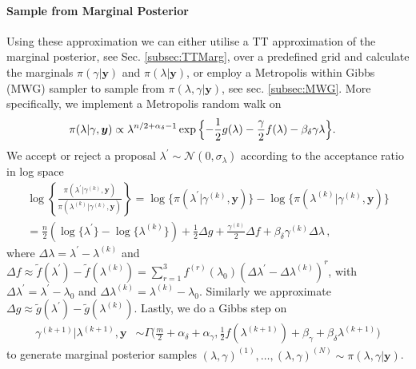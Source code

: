 \paragraph{Sample from Marginal Posterior}
Using these approximation we can either utilise a TT approximation of the marginal posterior, see Sec. \ref{subsec:TTMarg}, over a predefined grid and calculate the marginals $\pi(\gamma|\bm{y})$ and $\pi(\lambda|\bm{y})$, or employ a Metropolis within Gibbs (MWG) sampler to sample from $\pi(\lambda,\gamma|\bm{y})$, see sec. \ref{subsec:MWG}.
More specifically, we implement a Metropolis random walk on
\begin{align}
	\label{eq:margApplCondGam}
	\pi(\lambda | \gamma, \bm{y}) &\propto \lambda^{n/2 +\alpha_{\delta}-1} \exp{\Bigl\{ - \frac{1}{2} g ( \lambda) - \frac{\gamma}{2} f ( \lambda) - \beta_\delta \gamma \lambda \Bigr\}}.
\end{align} 
We accept or reject a proposal $\lambda^{\prime} \sim \mathcal{N}(0, \sigma_{\lambda})$ according to the acceptance ratio in log space
\begin{align} 
	\log \left\{ \frac{\pi(\lambda^{\prime} | \gamma^{(k)}, \bm{y})  }{\pi(\lambda^{(k)}| \gamma^{(k)}, \bm{y})}  \right\} 
	= \log  \{\pi(\lambda^{\prime} | \gamma^{(k)}, \bm{y} ) \}  -\log  \{ \pi(\lambda^{(k)}| \gamma^{(k)}, \bm{y}) \} \\
	= \frac{n}{2} (\log\{\lambda^{\prime}\} - \log\{\lambda^{(k)}\} ) + \frac{1}{2} \Delta g + \frac{\gamma^{(k)}}{2} \Delta f  + \beta_\delta \gamma^{(k)} \Delta \lambda  \, ,
\end{align}
where $\Delta \lambda = \lambda^{\prime} - \lambda^{(k)} $ and  $\Delta f \approx \tilde{f}(\lambda^\prime) - \tilde{f}(\lambda^{(k)}) = \sum^3_{r = 1} f^{(r)} (\lambda_0) (\Delta \lambda^\prime - \Delta \lambda^{(k)})^r $, with  $\Delta \lambda^{\prime} = \lambda^\prime - \lambda_0 $ and $\Delta \lambda^{(k)} =  \lambda^{(k)} - \lambda_0$.
Similarly we approximate $\Delta g \approx \tilde{g}(\lambda^{\prime}) -\tilde{g}(\lambda^{(k)})$.
Lastly, we do a Gibbs step on
\begin{align}
	\gamma^{(k+1)} |  \lambda^{(k+1)}, \bm{y} &\sim \Gamma \bigg( \frac{m}{2} + \alpha_\delta + \alpha_\gamma, \frac{1}{2} f (\lambda^{(k+1)}) + \beta_\gamma + \beta_\delta \lambda^{(k+1)} \bigg)\label{eq:GibbsStep}
\end{align} 
to generate marginal posterior samples $(\lambda, \gamma)^{(1)}, \dots, (\lambda, \gamma)^{(N)} \sim  \pi(\lambda, \gamma| \bm{y})$.
%
